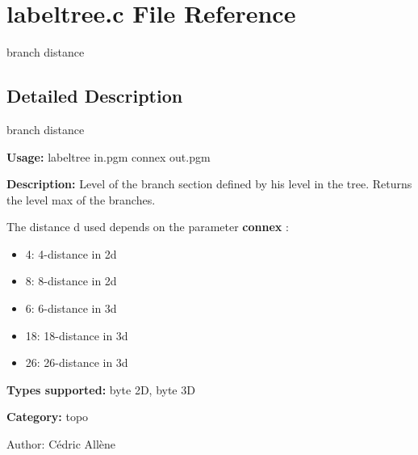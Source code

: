 \section{labeltree.c File Reference}
\label{labeltree_8c}
branch distance 



\subsection{Detailed Description}
branch distance 

{\bf Usage:} labeltree in.pgm connex out.pgm

{\bf Description:} Level of the branch section defined by his level in the tree. Returns the level max of the branches.

The distance d used depends on the parameter {\bf connex} : \begin{itemize}
\item 4: 4-distance in 2d \item 8: 8-distance in 2d \item 6: 6-distance in 3d \item 18: 18-distance in 3d \item 26: 26-distance in 3d\end{itemize}
{\bf Types supported:} byte 2D, byte 3D

{\bf Category:} topo

\begin{Desc}
\item[Author:]C\'{e}dric All\`{e}ne \end{Desc}
